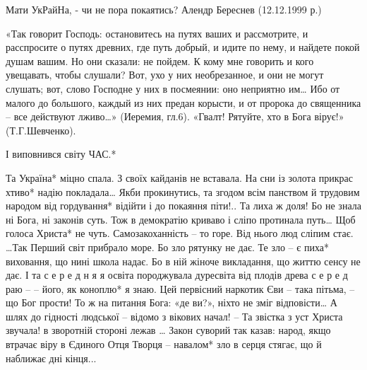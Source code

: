  
 
 
 
 

Мати УкРайНа, - чи не пора покаятись?
Алендр Береснев
                (12.12.1999 р.)

                «Так говорит Господь:  остановитесь на путях ваших и рассмотрите, и расспросите
                о путях древних, где путь добрый, и идите по нему, и найдете покой душам вашим.
                Но они сказали:  не пойдем.
                К кому мне говорить и кого увещавать, чтобы слушали? Вот, ухо у них
                необрезанное, и они не могут слушать;       вот, слово Господне у них в посмеянии:
                оно неприятно им…   Ибо от малого до большого, каждый из них предан корысти,
                и от пророка до священника – все действуют лживо…»  (Иеремия, гл.6).
                «Гвалт! Рятуйте, хто в Бога вірує!»  (Т.Г.Шевченко).

І виповнився світу  ЧАС.*

Та Україна* міцно спала.
З своїх кайданів не вставала.
На сни із золота прикрас
хтиво* надію покладала…
     Якби прокинутись, та згодом
     всім панством й трудовим народом
     від гордування* відійти
     і до покаяння піти!..
Та лиха ж доля!   Бо не знала
ні  Бога,  ні законів суть.
Тож в демократію криваво
і сліпо протинала путь…
Щоб голоса Христа* не чуть.
     Самозакоханність – то горе.
     Від нього люд сліпим стає.
     …Так Перший світ прибрало море.
     Бо зло рятунку не дає.
Те зло – є пиха* виховання,
що нині школа надає.
Бо в ній жіноче викладання,
що життю сенсу не дає.
     І та  с е р е д н я я  освіта
     породжувала дуресвіта
     від плодів древа  с е р е д  раю –
     – його, як коноплю* я знаю.
Цей первісний наркотик Єви --
така пітьма, – що Бог прости!
То ж на питання Бога: «де ви?»,
ніхто не зміг відповісти…
     А шлях до гідності людської –
     відомо з вікових начал!
     – Та  звістка з уст Христа звучала!
     в зворотній стороні лежав …
              Закон суворий так казав:
              народ, якщо втрачає віру
              в Єдиного Отця  Творця –
              навалом* зло в серця стягає,
              що й наближає дні кінця...

